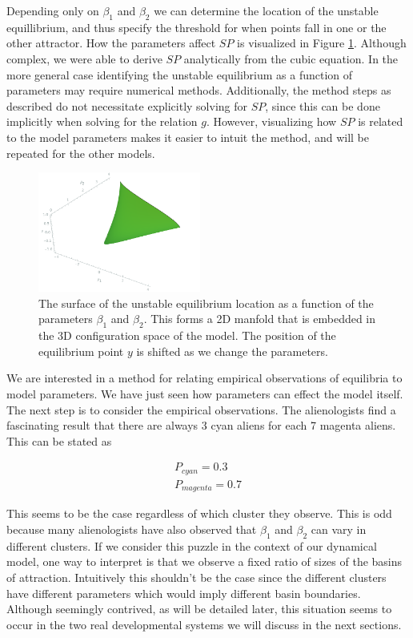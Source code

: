 \documentclass[letterpaper]{article}
\begin{document}
Depending only on $\beta_1$ and $\beta_2$ we
can determine the location of the unstable equillibrium, and thus specify the 
threshold for when points fall in one or the other attractor. How the parameters
affect $SP$ is visualized in Figure \ref{cubic_saddle}.
Although complex, we were able to derive $SP$ analytically from the cubic equation. 
In the more general case identifying the unstable equilibrium as a function 
of parameters may require numerical methods. Additionally, the method steps
as described do not necessitate explicitly solving for $SP$, since this can be
done implicitly when solving for the relation $g$. However, visualizing how 
$SP$ is related to the model parameters makes it easier to intuit the method,
and will be repeated for the other models. 

\begin{figure}[t]
\begin{center}
\includegraphics[width=2.1in,angle=0]{./saddle_cubic.png}
\caption{The surface of the unstable equilibrium location as a function of
the parameters $\beta_1$ and $\beta_2$. This forms a 2D manfold that is embedded in 
the 3D configuration space of the model. The position of the equilibrium point $y$
is shifted as we change the parameters.}
\label{cubic_saddle}
\end{center}
\end{figure}

We are interested in a method for relating empirical observations
of equilibria to model parameters. We have just seen how parameters can
effect the model itself. The next step is to consider the empirical 
observations.
The alienologists find a fascinating result that there
are always 3 cyan aliens for each 7 magenta aliens. This can be stated as 

\begin{eqnarray}
  P_{cyan} = 0.3\\
  P_{magenta} = 0.7
\end{eqnarray}

This seems to be the case regardless
of which cluster they observe. This is odd because many alienologists have
also observed that $\beta_1$ and $\beta_2$ can vary in different clusters. 
If we consider this puzzle in the context of our dynamical
model, one way to interpret is that we observe a fixed ratio of sizes of 
the basins of
attraction. Intuitively this shouldn't be the case since the different
clusters have different parameters which would imply different basin boundaries.
Although seemingly contrived, as will be detailed later, 
this situation seems to occur in the two
real developmental systems we will discuss in the next sections.
\end{document}
